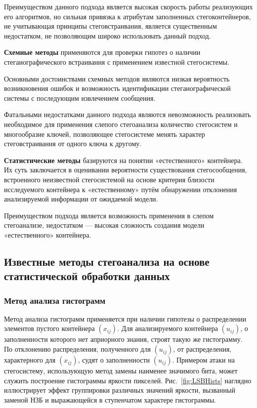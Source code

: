 Преимуществом данного подхода является высокая скорость работы реализующих его алгоритмов, но сильная привязка к атрибутам заполненных стегоконтейнеров, не учитывающая принципы стеговстраивания, является существенным недостатком, не позволяющим широко использовать данный подход.

\textbf{Схемные методы} применяются для проверки гипотез о наличии стеганографического встраивания с применением известной стегосистемы.

Основными достоинствами схемных методов являются низкая вероятность возникновения ошибок и возможность идентификации стеганографической системы с последующим извлечением сообщения.

Фатальными недостатками данного подхода являются невозможность реализовать необходимое для применения слепого стегоанализа количество стегосистем и многообразие ключей, позволяющее стегосистеме менять характер стеговстраивания от одного ключа к другому.

\textbf{Статистические методы} базируются на понятии «естественного» контейнера. Их суть заключается в оценивании вероятности существования стегосообщения, встроенного неизвестной стегосистемой на основе критерия близости исследуемого контейнера к «естественному» путём обнаружении отклонения анализируемой информации от ожидаемой модели.

Преимуществом подхода является возможность применения в слепом стегоанализе, недостатком — высокая сложность создания модели «естественного» контейнера.

\subsection{Известные методы стегоанализа на основе статистической обработки данных}

\subsubsection{Метод анализа гистограмм}

Метод анализа гистограмм применяется при наличии гипотезы о распределении элементов пустого контейнера $ (x_{ij}) $. Для анализируемого контейнера $ (u_{ij}) $, о заполненности которого нет априорного знания, строят такую же гистограмму. По отклонению распределения, полученного для $ (u_{ij}) $, от распределения, характерного для $ (x_{ij}) $, судят о заполненности $ (u_{ij}) $. Примером атаки на стегосистему, использующую метод замены наименее значимого бита, может служить построение гистограммы яркости пикселей. Рис.~\ref{fig:LSBHists} наглядно иллюстрирует эффект группировки различных значений яркости, вызванный заменой НЗБ и выражающейся в ступенчатом характере гистограммы.

